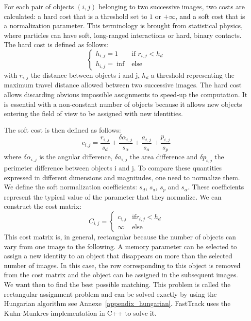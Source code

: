     For each pair of objects $(i,j)$ belonging to two successive images, two costs are calculated: a hard cost that is a threshold set to $1$ or $+ \infty$, and a soft cost that is a normalization parameter. This terminology is brought from statistical physics, where particles can have soft, long-ranged interactions or hard, binary contacts.
    The hard cost is defined as follows:
    \begin{equation}
        \left\{
            \begin{array}{ll}
                h_{i,j} = 1 & \mbox{if } r_{i,j} < h_{d} \\
                h_{i,j} = \inf & \mbox{else }
            \end{array}
        \right.
    \end{equation}
    \noindent with $r_{i,j}$ the distance between objects i and j, $h_{d}$ a threshold representing the maximum travel distance allowed between two successive images. The hard cost allows discarding obvious impossible assignments to speed-up the computation. It is essential with a non-constant number of objects because it allows new objects entering the field of view to be assigned with new identities.

    The soft cost is then defined as follows:
    \begin{equation}
        c_{i,j} = \frac{r_{i,j}}{s_d} + \frac{\delta\alpha_{i,j}}{s_{\alpha}} + \frac{a_{i,j}}{s_a} + \frac{p_{i,j}}{s_p}
    \end{equation}
    \noindent where $\delta\alpha_{i,j}$ is the angular difference, $\delta a_{i,j}$ the area difference and $\delta p_{i,j}$ the perimeter difference between objects i and j. To compare these quantities expressed in different dimensions and magnitudes, one need to normalize them. We define the soft normalization coefficients: $s_{d}$, $s_{a}$, $s_{p}$ and $s_{\alpha}$. These coefficients represent the typical value of the parameter that they normalize.
    We can construct the cost matrix:
    \begin{equation}
        C_{i,j} = \left\{
            \begin{array}{ll}
                c_{i,j} & \mbox{if} r_{i,j} < h_{d} \\
                \infty & \mbox{else}
            \end{array}
        \right.
    \end{equation}
    This cost matrix is, in general, rectangular because the number of objects can vary from one image to the following. A memory parameter can be selected to assign a new identity to an object that disappears on more than the selected number of images. In this case, the row corresponding to this object is removed from the cost matrix and the object can be assigned in the subsequent images.
    We want then to find the best possible matching. This problem is called the rectangular assignment problem and can be solved exactly by using the Hungarian algorithm see Annexe~\ref{appendix_hungarian}. FastTrack uses the Kuhn-Munkres implementation in C++ to solve it.

